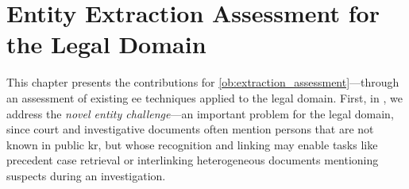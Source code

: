 \chapter{Entity Extraction Assessment for the Legal Domain}
\label{chap:extraction}


This chapter presents the contributions for \ref{ob:extraction_assessment}---through an assessment of existing \ac{ee} techniques applied to the legal domain.
First, in , we address the \emph{novel entity challenge}---an important problem for the legal domain, since court and investigative documents often mention persons that are not known in public \acl{kr}, but whose recognition and linking may enable tasks like precedent case retrieval or interlinking heterogeneous documents mentioning suspects during an investigation.

